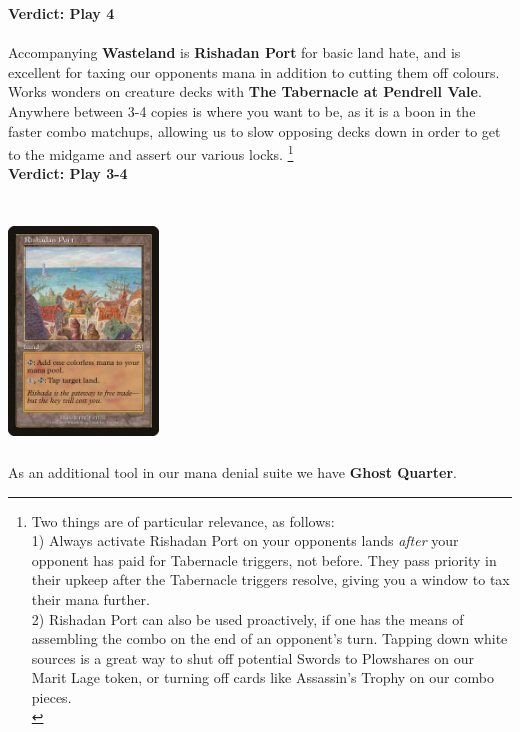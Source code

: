 \documentclass{report}
\begin{document}
\textbf{Verdict: Play 4\\\\}
Accompanying \textbf{Wasteland} is \textbf{Rishadan Port} for basic land hate, and is excellent for taxing our opponents mana in addition to cutting them off colours. Works wonders on creature decks with \textbf{The Tabernacle at Pendrell Vale}. Anywhere between 3-4 copies is where you want to be, as it is a boon in the faster combo matchups, allowing us to slow opposing decks down in order to get to the midgame and assert our various locks.
\footnote{Two things are of particular relevance, as follows:\\
1) Always activate Rishadan Port on your opponents lands \emph{after} your opponent has paid for Tabernacle triggers, not before. They pass priority in their upkeep after the Tabernacle triggers resolve, giving you a window to tax their mana further.\\
2) Rishadan Port can also be used proactively, if one has the means of assembling the combo on the end of an opponent's turn. Tapping down white sources is a great way to shut off potential Swords to Plowshares on our Marit Lage token, or turning off cards like Assassin's Trophy on our combo pieces.\\}\\\textbf{Verdict: Play 3-4}\\\\
\begin{center}
\includegraphics [width = 4cm, height = 6cm] {rishadan-port}
\end{center}
As an additional tool in our mana denial suite we have \textbf{Ghost Quarter}.
\end{document}
